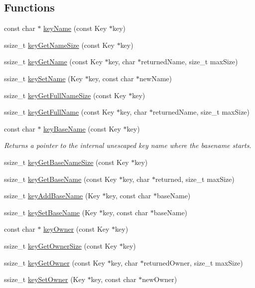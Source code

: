 \subsection*{Functions}
\begin{DoxyCompactItemize}
\item 
const char $\ast$ \hyperlink{group__keyname_ga8e805c726a60da921d3736cda7813513}{key\-Name} (const Key $\ast$key)
\item 
ssize\-\_\-t \hyperlink{group__keyname_gabdbcfa51ed8a387e47ead207affa2d2e}{key\-Get\-Name\-Size} (const Key $\ast$key)
\item 
ssize\-\_\-t \hyperlink{group__keyname_gab29a850168d9b31c9529e90cf9ab68be}{key\-Get\-Name} (const Key $\ast$key, char $\ast$returned\-Name, size\-\_\-t max\-Size)
\item 
ssize\-\_\-t \hyperlink{group__keyname_ga7699091610e7f3f43d2949514a4b35d9}{key\-Set\-Name} (Key $\ast$key, const char $\ast$new\-Name)
\item 
ssize\-\_\-t \hyperlink{group__keyname_gab65dc9d43d3ee08d5e936a20ebbddd23}{key\-Get\-Full\-Name\-Size} (const Key $\ast$key)
\item 
ssize\-\_\-t \hyperlink{group__keyname_gaaba1494a5ffc976e0e56c43f4334a23c}{key\-Get\-Full\-Name} (const Key $\ast$key, char $\ast$returned\-Name, size\-\_\-t max\-Size)
\item 
const char $\ast$ \hyperlink{group__keyname_gaaff35e7ca8af5560c47e662ceb9465f5}{key\-Base\-Name} (const Key $\ast$key)
\begin{DoxyCompactList}\small\item\em Returns a pointer to the internal unescaped key name where the {\ttfamily basename} starts. \end{DoxyCompactList}\item 
ssize\-\_\-t \hyperlink{group__keyname_ga1a0b76c5d9e5367c7e72211e6c63d43a}{key\-Get\-Base\-Name\-Size} (const Key $\ast$key)
\item 
ssize\-\_\-t \hyperlink{group__keyname_ga0992d26bcfca767cb8e77053a483eb64}{key\-Get\-Base\-Name} (const Key $\ast$key, char $\ast$returned, size\-\_\-t max\-Size)
\item 
ssize\-\_\-t \hyperlink{group__keyname_gaa942091fc4bd5c2699e49ddc50829524}{key\-Add\-Base\-Name} (Key $\ast$key, const char $\ast$base\-Name)
\item 
ssize\-\_\-t \hyperlink{group__keyname_ga6e804bd453f98c28b0ff51430d1df407}{key\-Set\-Base\-Name} (Key $\ast$key, const char $\ast$base\-Name)
\item 
const char $\ast$ \hyperlink{group__keyname_gaf6485fb8599714b6bbd830cf915ffea5}{key\-Owner} (const Key $\ast$key)
\item 
ssize\-\_\-t \hyperlink{group__keyname_ga4a4561895741ba2ad10acf007c188593}{key\-Get\-Owner\-Size} (const Key $\ast$key)
\item 
ssize\-\_\-t \hyperlink{group__keyname_ga35922a017bee8b4bcb493bbdfad9d6f5}{key\-Get\-Owner} (const Key $\ast$key, char $\ast$returned\-Owner, size\-\_\-t max\-Size)
\item 
ssize\-\_\-t \hyperlink{group__keyname_ga88d6ec200ba0707b7c1b4a88133d2be4}{key\-Set\-Owner} (Key $\ast$key, const char $\ast$new\-Owner)
\end{DoxyCompactItemize}


